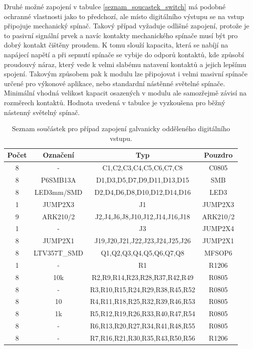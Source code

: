 \documentclass[12pt,a4paper,oneside]{article}
\begin{document}
Druhé možné zapojení v tabulce \ref{seznam_soucastek_switch} má podobné ochranné vlastnosti jako to předchozí, ale místo digitálního výstupu se na vstup připojuje mechanický spínač. Takový případ vyžaduje odlišné zapojení, protože je to pasivní signální prvek a navíc kontakty mechanického spínače musí být pro dobrý kontakt čištěny proudem.  K tomu slouží kapacita, která se nabíjí na napájecí napětí a při sepnutí spínače se vybije do odporů kontaktů, kde způsobí proudouvý náraz, který vede k velmi slabému natavení kontaktů a jejich lepšímu spojení.  Takovým způsobem pak k modulu lze připojovat i velmi masivní spínače určené pro výkonové aplikace, nebo standardní nástěnné světelné spínače. Minimální vhodná velikost kapacit osazených v modulu ale samozřejmě závisí na rozměrech kontaktů. Hodnota uvedená v tabulce je vyzkoušena pro běžný nástenný světelný spínač. 


\begin{savenotes}
\begin{table}[h!]
\begin{center}
\begin{tabular}{ |c|c|c|c| }
\hline 
Počet & Označení & Typ  & Pouzdro  \\ 
\hline 
8	&	-	&	C1,C2,C3,C4,C5,C6,C7,C8	&	C0805	\\
8	&	P6SMB13A	&	D1,D3,D5,D7,D9,D11,D13,D15	&	SMB	\\
8	&	LED3mm/SMD	&	D2,D4,D6,D8,D10,D12,D14,D16	&	LED3	\\
1	&	JUMP2X3	&	J1	&	JUMP2X3	\\
9	&	ARK210/2	&	J2,J4,J6,J8,J10,J12,J14,J16,J18	&	ARK210/2	\\
1	&	-	&	J3	&	JUMP2X4	\\
8	&	JUMP2X1	&	J19,J20,J21,J22,J23,J24,J25,J26	&	JUMP2X1	\\
8	&	LTV357T\_SMD	&	Q1,Q2,Q3,Q4,Q5,Q6,Q7,Q8	&	MFSOP6	\\
1	&	-	&	R1	&	R1206	\\
8	&	10k	&	R2,R9,R14,R23,R28,R37,R42,R49	&	R0805	\\
8	&	-	&	R3,R10,R15,R24,R29,R38,R45,R52	&	R0805	\\
8	&	10	&	R4,R11,R18,R25,R32,R39,R46,R53	&	R0805	\\
8	&	1k	&	R5,R12,R19,R26,R33,R40,R47,R54	&	R0805	\\
8	&	-	&	R6,R13,R20,R27,R34,R41,R48,R55	&	R0805	\\
8	&	-	&	R7,R16,R21,R30,R35,R43,R50,R56	&	R1206	\\
\hline 
\end{tabular}
\end{center}
\caption{Seznam součástek pro případ zapojení galvanicky odděleného digitálního vstupu.}
\label{seznam_soucastek_galvanic_isolation}
\end{table}
\end{savenotes}
\end{document}
